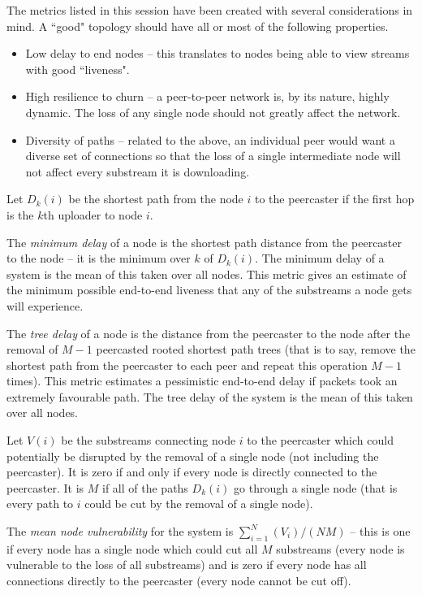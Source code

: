 The metrics listed in this session have been created with several
considerations in mind.  A ``good" topology should have all or
most of the following properties.
\begin{itemize}
\item Low delay to end nodes -- this translates to nodes being able to
view streams with good ``liveness".
\item High resilience to churn -- a peer-to-peer network is, by its
nature, highly dynamic.  The loss of any single node should
not greatly affect the network.  
\item Diversity of paths -- related to the above,
an individual peer would want a diverse
set of connections so that the loss of a single intermediate 
node will not affect every substream it is downloading.
\end{itemize}

Let $D_k(i)$ be the shortest path from the node $i$ to the peercaster if the
first hop is the $k$th uploader to node $i$.

\begin{definition}
The {\em minimum delay\/} of a node is the shortest path distance from the 
peercaster to the node -- it is the minimum over $k$ of $D_k(i)$.  
The minimum delay of a system is the mean of this 
taken over all nodes.  This metric gives an estimate of the minimum possible
end-to-end liveness that any of the substreams a node gets will experience.
\end{definition}

\begin{definition}
The {\em tree delay\/} of a node is the distance from the peercaster to
the node after the removal of $M-1$ peercasted rooted shortest
path trees (that is to say,
remove the shortest path from the peercaster to each peer and repeat
this operation $M-1$ times).  This metric
estimates a pessimistic end-to-end delay if packets took an extremely
favourable path.
The tree delay of the system is the mean of this taken over all nodes.
\end{definition}

Let $V(i)$ be
the substreams connecting node $i$ to the peercaster which could potentially 
be disrupted by the removal of a single node (not including the
peercaster).  It is zero if and only if every node 
is directly connected to the peercaster.  It is $M$ if all of the paths
$D_k(i)$ go through a single node (that is every path to $i$ could be
cut by the removal of a single node).

\begin{definition}
The {\em mean node vulnerability\/} for the
system is $\sum_{i=1}^N (V_i)/(NM)$ -- this
is one if every node has a single node which could cut all $M$ substreams 
(every node is vulnerable to the loss of all substreams) and
is zero if every node has all connections directly to the peercaster
(every node cannot be cut off).
\end{definition}

